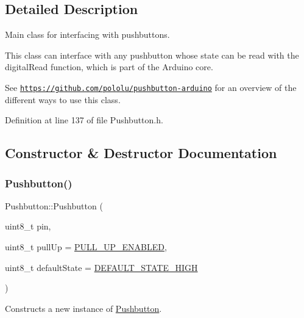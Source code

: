 \subsection{Detailed Description}
Main class for interfacing with pushbuttons. 

This class can interface with any pushbutton whose state can be read with the {\ttfamily digital\+Read} function, which is part of the Arduino core.

See \href{https://github.com/pololu/pushbutton-arduino}{\tt https\+://github.\+com/pololu/pushbutton-\/arduino} for an overview of the different ways to use this class. 

Definition at line 137 of file Pushbutton.\+h.



\subsection{Constructor \& Destructor Documentation}
\mbox{\label{class_pushbutton_a73d08312ffb3502580485d3d2051e19f}} 
\subsubsection{\texorpdfstring{Pushbutton()}{Pushbutton()}}
{\footnotesize\ttfamily Pushbutton\+::\+Pushbutton (\begin{DoxyParamCaption}\item[{uint8\+\_\+t}]{pin,  }\item[{uint8\+\_\+t}]{pull\+Up = {\ttfamily \hyperlink{_pushbutton_8h_a2556d56311dd94f5834ef8fb4e6d875d}{P\+U\+L\+L\+\_\+\+U\+P\+\_\+\+E\+N\+A\+B\+L\+ED}},  }\item[{uint8\+\_\+t}]{default\+State = {\ttfamily \hyperlink{_pushbutton_8h_ad0c2918a36a770522d44451389d22f34}{D\+E\+F\+A\+U\+L\+T\+\_\+\+S\+T\+A\+T\+E\+\_\+\+H\+I\+GH}} }\end{DoxyParamCaption})}

Constructs a new instance of \hyperlink{class_pushbutton}{Pushbutton}.


